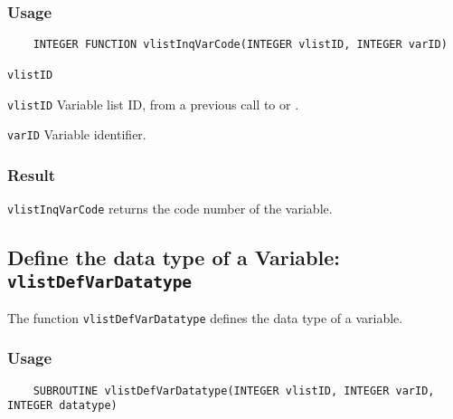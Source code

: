 \subsubsection*{Usage}

\begin{verbatim}
    INTEGER FUNCTION vlistInqVarCode(INTEGER vlistID, INTEGER varID)
\end{verbatim}

\hspace*{4mm}\begin{minipage}[]{15cm}
\begin{deflist}{\texttt{vlistID}\ }
\item[\texttt{vlistID}]
Variable list ID, from a previous call to {} or {}.
\item[\texttt{varID}]
Variable identifier.

\end{deflist}
\end{minipage}

\subsubsection*{Result}

{\texttt{vlistInqVarCode}} returns the code number of the variable.



\subsection{Define the data type of a Variable: \texttt{vlistDefVarDatatype}}
\label{vlistDefVarDatatype}

The function {\texttt{vlistDefVarDatatype}} defines the data type of a variable.

\subsubsection*{Usage}

\begin{verbatim}
    SUBROUTINE vlistDefVarDatatype(INTEGER vlistID, INTEGER varID, INTEGER datatype)
\end{verbatim}

